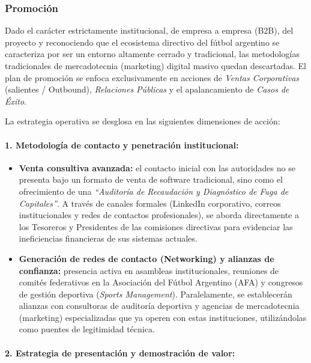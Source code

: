 \subsubsection*{Promoción}

Dado el carácter estrictamente institucional, de empresa a empresa (B2B), del proyecto y reconociendo que el ecosistema directivo del fútbol argentino se caracteriza por ser un entorno altamente cerrado y tradicional, las metodologías tradicionales de mercadotecnia (marketing) digital masivo quedan descartadas. El plan de promoción se enfoca exclusivamente en acciones de \textit{Ventas Corporativas} (salientes / Outbound), \textit{Relaciones Públicas} y el apalancamiento de \textit{Casos de Éxito}.

La estrategia operativa se desglosa en las siguientes dimensiones de acción:

\paragraph{1. Metodología de contacto y penetración institucional:}

\begin{itemize}
    \item \textbf{Venta consultiva avanzada:} el contacto inicial con las autoridades no se presenta bajo un formato de venta de software tradicional, sino como el ofrecimiento de una \textit{``Auditoría de Recaudación y Diagnóstico de Fuga de Capitales''}. A través de canales formales (LinkedIn corporativo, correos institucionales y redes de contactos profesionales), se aborda directamente a los Tesoreros y Presidentes de las comisiones directivas para evidenciar las ineficiencias financieras de sus sistemas actuales.
    \item \textbf{Generación de redes de contacto (Networking) y alianzas de confianza:} presencia activa en asambleas institucionales, reuniones de comités federativos en la Asociación del Fútbol Argentino (AFA) y congresos de gestión deportiva (\textit{Sports Management}). Paralelamente, se establecerán alianzas con consultoras de auditoría deportiva y agencias de mercadotecnia (marketing) especializadas que ya operen con estas instituciones, utilizándolas como puentes de legitimidad técnica.
\end{itemize}

\paragraph{2. Estrategia de presentación y demostración de valor:}

